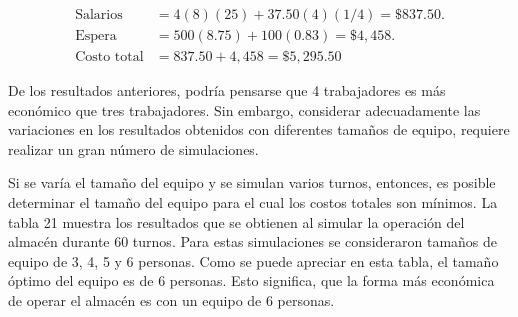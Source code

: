 \documentclass[11pt,letterpaper]{report}
\begin{document}
\begin{align*}
\text{Salarios} &= 4(8)(25) + 37.50(4)(1/4) = \$837.50. \\[6pt]
\text{Espera} &= 500(8.75) + 100(0.83) = \$4{,}458. \\[6pt]
\text{Costo total} &= 837.50 + 4{,}458 = \$5{,}295.50
\end{align*}

De los resultados anteriores, podría pensarse que 4 trabajadores es más
económico que tres trabajadores. Sin embargo, considerar adecuadamente las
variaciones en los resultados obtenidos con diferentes tamaños de equipo,
requiere realizar un gran número de simulaciones.

Si se varía el tamaño del equipo y se simulan varios turnos, entonces, es
posible determinar el tamaño del equipo para el cual los costos totales son
mínimos. La tabla 21 muestra los resultados que se obtienen al simular la
operación del almacén durante 60 turnos. Para estas simulaciones se
consideraron tamaños de equipo de 3, 4, 5 y 6 personas. Como se puede
apreciar en esta tabla, el tamaño óptimo del equipo es de 6 personas. Esto
significa, que la forma más económica de operar el almacén es con un equipo
de 6 personas.
\end{document}
